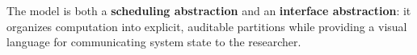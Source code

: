 \documentclass[11pt, a4paper, oneside]{article}
\theoremstyle{definition}
\begin{document}
The model is both a \textbf{scheduling abstraction} and an
\textbf{interface abstraction}: it organizes computation into explicit,
auditable partitions while providing a visual language for communicating
system state to the researcher.

\end{document}
